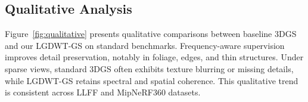 




\subsection{Qualitative Analysis}

Figure~\ref{fig:qualitative} presents qualitative comparisons between baseline 3DGS and our LGDWT-GS on standard benchmarks.  
Frequency-aware supervision improves detail preservation, notably in foliage, edges, and thin structures.  
Under sparse views, standard 3DGS often exhibits texture blurring or missing details, while LGDWT-GS retains spectral and spatial coherence.  
This qualitative trend is consistent across LLFF and MipNeRF360 datasets.



